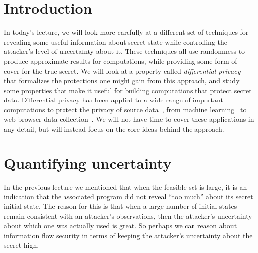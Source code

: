\documentclass[11pt,twoside]{scrartcl}
\begin{document}
\newcommand{\atrace}{\omega}%
\newcommand{\stdI}{\dTLint[state=\omega]}%
\newcommand{\Ip}{\dTLint[trace=\atrace]}%
\newcommand{\ws}{\omega}\newcommand{\wt}{\nu}%

\maketitle
\thispagestyle{empty}


\section{Introduction}

In today's lecture, we will look more carefully at a different set of techniques for revealing some useful information about secret state while controlling the attacker's level of uncertainty about it. These techniques all use randomness to produce approximate results for computations, while providing some form of cover for the true secret. We will look at a property called \emph{differential privacy}~\cite{dwork06} that formalizes the protections one might gain from this approach, and study some properties that make it useful for building computations that protect secret data. Differential privacy has been applied to a wide range of important computations to protect the privacy of source data~\cite{Dwork2014}, from machine learning~\cite{Chaudhuri2011} to web browser data collection~\cite{ErlingssonKP14}. We will not have time to cover these applications in any detail, but will instead focus on the core ideas behind the approach.

\section{Quantifying uncertainty}

In the previous lecture we mentioned that when the feasible set is large, it is an indication that the associated program did not reveal ``too much'' about its secret initial state. The reason for this is that when a large number of initial states remain consistent with an attacker's observations, then the attacker's uncertainty about which one was actually used is great. So perhaps we can reason about information flow security in terms of keeping the attacker's uncertainty about the secret high.
\end{document}
